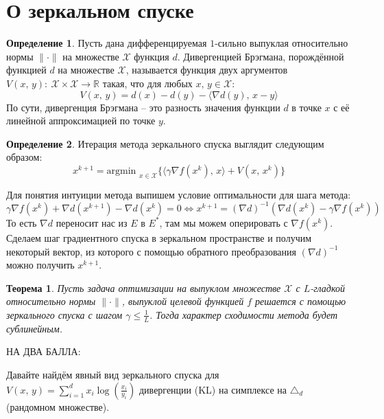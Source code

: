 \documentclass[a4paper,12pt]{article}
\renewcommand{\leq}{\ensuremath{\leqslant}}
\theoremstyle{plain}
\newtheorem{theorem}{Теорема}[section]
\theoremstyle{definition}
\newtheorem{definition}{Определение}[section]
\theoremstyle{remark}
\begin{document}
\section{О зеркальном спуске}
\begin{definition}
	Пусть дана дифференцируемая $1$-сильно выпуклая относительно нормы $\|\cdot\|$ на множестве $\mathcal{X}$ функция $d$. Дивергенцией Брэгмана, порождённой функцией $d$ на множестве $\mathcal{X}$, называется функция двух аргументов $V(x,\, y) :\: \mathcal{X} \times \mathcal{X} \to \mathbb{R}$ такая, что для любых $x,\, y \in \mathcal{X}$:
	\[
		V(x,\, y) = d(x) - d(y) - \langle\nabla d(y),\, x - y\rangle
	\]
	По сути, дивергенция Брэгмана -- это разность значения функции $d$ в точке $x$ с её линейной аппроксимацией по точке $y$.
\end{definition}

\begin{definition}
	Итерация метода зеркального спуска выглядит следующим образом:
	\[
		x^{k + 1} = \text{argmin }_{x \in \mathcal{X}} \{\langle \gamma\nabla f(x^k),\, x\rangle + V(x,\, x^k)\}
	\]
\end{definition}

Для понятия интуиции метода выпишем условие оптимальности для шага метода:
\[
	\gamma\nabla f(x^k) + \nabla d(x^{k + 1}) - \nabla d(x^k) = 0  \Leftrightarrow x^{k + 1} = (\nabla d)^{-1}(\nabla d(x^k) - \gamma\nabla f(x^k))
\]
То есть $\nabla d$ переносит нас из $E$ в $E^*$, там мы можем оперировать с $\nabla f(x^k)$. Сделаем шаг градиентного спуска в зеркальном пространстве и получим некоторый вектор, из которого с помощью обратного преобразования $(\nabla d)^{-1}$ можно получить $x^{k + 1}$.

\begin{theorem}
	Пусть задача оптимизации на выпуклом множестве $\mathcal{X}$ с $L$-гладкой относительно нормы $\|\cdot\|$, выпуклой целевой функцией $f$ решается с помощью зеркального спуска с шагом $\gamma \leq \frac{1}{L}$. Тогда характер сходимости метода будет сублинейным.
\end{theorem}

НА ДВА БАЛЛА:

Давайте найдём явный вид зеркального спуска для $V(x,\, y) = \sum_{i = 1}^d x_i\log\left(\frac{x_i}{y_i}\right)$ дивергенции (KL) на симплексе на $\triangle_d$ (рандомном множестве).
\end{document}
